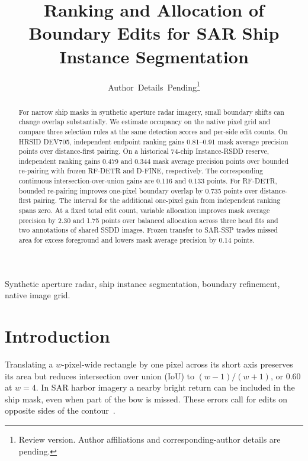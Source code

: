 \documentclass[journal]{IEEEtran}
\begin{document}
\raggedbottom
\title{Ranking and Allocation of Boundary Edits for SAR Ship Instance Segmentation}
\author{Author~Details~Pending\thanks{Review version. Author affiliations and corresponding-author details are pending.}}
\maketitle

\begin{abstract}
For narrow ship masks in synthetic aperture radar imagery, small boundary shifts can change overlap substantially. We estimate occupancy on the native pixel grid and compare three selection rules at the same detection scores and per-side edit counts. On HRSID DEV705, independent endpoint ranking gains 0.81--0.91 mask average precision points over distance-first pairing. On a historical 74-chip Instance-RSDD reserve, independent ranking gains 0.479 and 0.344 mask average precision points over bounded re-pairing with frozen RF-DETR and D-FINE, respectively. The corresponding continuous intersection-over-union gains are 0.116 and 0.133 points. For RF-DETR, bounded re-pairing improves one-pixel boundary overlap by 0.735 points over distance-first pairing. The interval for the additional one-pixel gain from independent ranking spans zero. At a fixed total edit count, variable allocation improves mask average precision by 2.30 and 1.75 points over balanced allocation across three head fits and two annotations of shared SSDD images. Frozen transfer to SAR-SSP trades missed area for excess foreground and lowers mask average precision by 0.14 points.
\end{abstract}

\begin{IEEEkeywords}
Synthetic aperture radar, ship instance segmentation, boundary refinement, native image grid.
\end{IEEEkeywords}

\section{Introduction}
\label{sec:introduction}

Translating a \(w\)-pixel-wide rectangle by one pixel across its short axis preserves its area but reduces intersection over union (IoU) to \((w-1)/(w+1)\), or \(0.60\) at \(w=4\). In SAR harbor imagery a nearby bright return can be included in the ship mask, even when part of the bow is missed. These errors call for edits on opposite sides of the contour~\cite{hrsid,rsdd,gao2024}.
\end{document}
